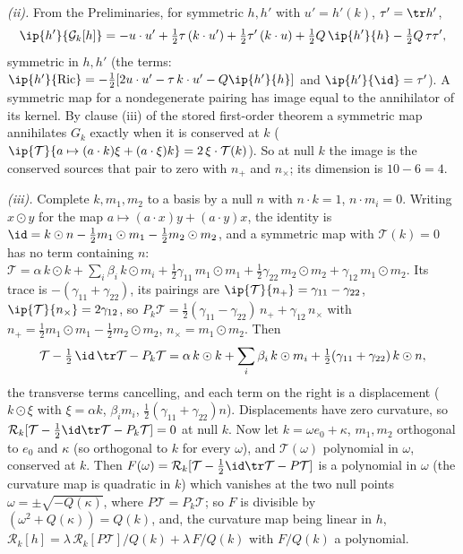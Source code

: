 \emph{(ii).} From the Preliminaries, for symmetric $h, h'$ with $u' = h'(k)$, $\tau' = \tr h'$,
\[
\ip{h'}{\mathcal{G}_{k}[h]} = -u \cdot u' + \tfrac12\tau\,(k \cdot u') + \tfrac12\tau'\,(k \cdot u) + \tfrac12 Q\,\ip{h'}{h} - \tfrac12 Q\,\tau\tau' ,
\]
symmetric in $h, h'$ (the terms: $\ip{h'}{\mathrm{Ric}} = -\tfrac12[2u \cdot u' - \tau\,k \cdot u' - Q\ip{h'}{h}]$ and $\ip{h'}{\id} = \tau'$). A symmetric map for a nondegenerate pairing has image equal to the annihilator of its kernel. By clause (iii) of the stored first-order theorem a symmetric map annihilates $G_{k}$ exactly when it is conserved at $k$ ($\ip{\mathcal{T}}{a \mapsto (a \cdot k)\xi + (a \cdot \xi)k} = 2\,\xi \cdot \mathcal{T}(k)$). So at null $k$ the image is the conserved sources that pair to zero with $n_{+}$ and $n_{\times}$; its dimension is $10 - 6 = 4$.

\emph{(iii).} Complete $k, m_{1}, m_{2}$ to a basis by a null $n$ with $n \cdot k = 1$, $n \cdot m_{i} = 0$. Writing $x \odot y$ for the map $a \mapsto (a \cdot x)y + (a \cdot y)x$, the identity is $\id = k \odot n - \tfrac12 m_{1} \odot m_{1} - \tfrac12 m_{2} \odot m_{2}$, and a symmetric map with $\mathcal{T}(k) = 0$ has no term containing $n$: $\mathcal{T} = \alpha\,k \odot k + \sum_{i}\beta_{i}\,k \odot m_{i} + \tfrac12\gamma_{11}\,m_{1} \odot m_{1} + \tfrac12\gamma_{22}\,m_{2} \odot m_{2} + \gamma_{12}\,m_{1} \odot m_{2}$. Its trace is $-(\gamma_{11} + \gamma_{22})$, its pairings are $\ip{\mathcal{T}}{n_{+}} = \gamma_{11} - \gamma_{22}$, $\ip{\mathcal{T}}{n_{\times}} = 2\gamma_{12}$, so $P_{k}\mathcal{T} = \tfrac12(\gamma_{11} - \gamma_{22})\,n_{+} + \gamma_{12}\,n_{\times}$ with $n_{+} = \tfrac12 m_{1} \odot m_{1} - \tfrac12 m_{2} \odot m_{2}$, $n_{\times} = m_{1} \odot m_{2}$. Then
\[
\mathcal{T} - \tfrac12\,\id\,\tr\mathcal{T} - P_{k}\mathcal{T} = \alpha\,k \odot k + \sum_{i}\beta_{i}\,k \odot m_{i} + \tfrac12(\gamma_{11} + \gamma_{22})\,k \odot n ,
\]
the transverse terms cancelling, and each term on the right is a displacement ($k \odot \xi$ with $\xi = \alpha k$, $\beta_{i}m_{i}$, $\tfrac12(\gamma_{11} + \gamma_{22})n$). Displacements have zero curvature, so $\mathcal{R}_{k}[\mathcal{T} - \tfrac12\id\tr\mathcal{T} - P_{k}\mathcal{T}] = 0$ at null $k$. Now let $k = \omega e_{0} + \kappa$, $m_{1}, m_{2}$ orthogonal to $e_{0}$ and $\kappa$ (so orthogonal to $k$ for every $\omega$), and $\mathcal{T}(\omega)$ polynomial in $\omega$, conserved at $k$. Then $F(\omega) = \mathcal{R}_{k}[\mathcal{T} - \tfrac12\id\tr\mathcal{T} - P\mathcal{T}]$ is a polynomial in $\omega$ (the curvature map is quadratic in $k$) which vanishes at the two null points $\omega = \pm\sqrt{-Q(\kappa)}$, where $P\mathcal{T} = P_{k}\mathcal{T}$; so $F$ is divisible by $(\omega^{2} + Q(\kappa)) = Q(k)$, and, the curvature map being linear in $h$, $\mathcal{R}_{k}[h] = \lambda\,\mathcal{R}_{k}[P\mathcal{T}]/Q(k) + \lambda\,F/Q(k)$ with $F/Q(k)$ a polynomial.

